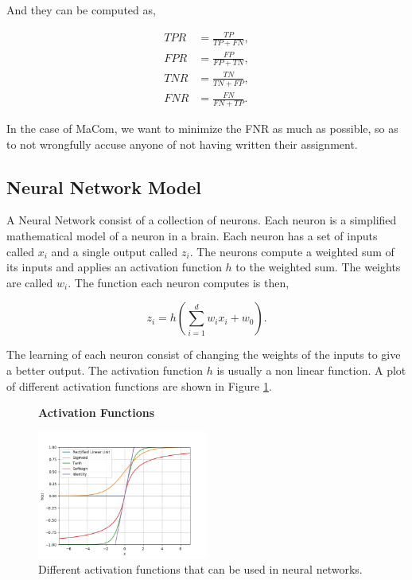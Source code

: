 And they can be computed as,

\begin{align}
    TPR &= \frac{TP}{TP + FN}, \\
    FPR &= \frac{FP}{FP + TN}, \\
    TNR &= \frac{TN}{TN + FP}, \\
    FNR &= \frac{FN}{FN + TP}.
\end{align}

In the case of MaCom, we want to minimize the \gls{FNR} as much as possible, so
as to not wrongfully accuse anyone of not having written their assignment.


\subsection{Neural Network Model}

A Neural Network consist of a collection of neurons. Each neuron is a simplified
mathematical model of a neuron in a brain. Each neuron has a set of inputs
called $x_i$ and a single output called $z_i$. The neurons compute a weighted
sum of its inputs and applies an activation function $h$ to the weighted sum.
The weights are called $w_i$. The function each neuron computes is then,

\begin{equation}
    z_i = h\left(
        \sum_{i = 1}^d w_ix_i + w_0
    \right).
\end{equation}

The learning of each neuron consist of changing the weights of the inputs to
give a better output. The activation function $h$ is usually a non linear
function. A plot of different activation functions are shown in Figure
\ref{fig:activation_functions}.

\begin{figure}
    \centering
    \textbf{Activation Functions}\par\medskip
    \includegraphics[width=0.5\textwidth]{./pictures/method/activation_functions.png}
    \caption{Different activation functions that can be used in neural
        networks.}
    \label{fig:activation_functions}
\end{figure}

